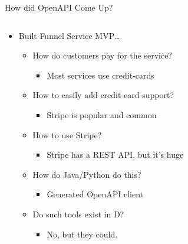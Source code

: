 \documentclass[bigger]{beamer}
\begin{document}
\begin{frame}[label={sec:org554819f}]{How did OpenAPI Come Up?}
\begin{columns}
\begin{column}{0.6\columnwidth}
\begin{itemize}
\item Built Funnel Service MVP\ldots{}
\begin{itemize}
\item How do customers pay for the service?
\begin{itemize}
\item Most services use credit-cards
\end{itemize}
\item How to easily add credit-card support?
\begin{itemize}
\item Stripe is popular and common
\end{itemize}
\item How to use Stripe?
\begin{itemize}
\item Stripe has a REST API, but it's huge
\end{itemize}
\item How do Java/Python do this?
\begin{itemize}
\item Generated OpenAPI client
\end{itemize}
\item Do such tools exist in D?
\begin{itemize}
\item \alert{No}, but they could.
\end{itemize}
\end{itemize}
\end{itemize}
\end{column}


\end{columns}
\end{frame}
\end{document}
